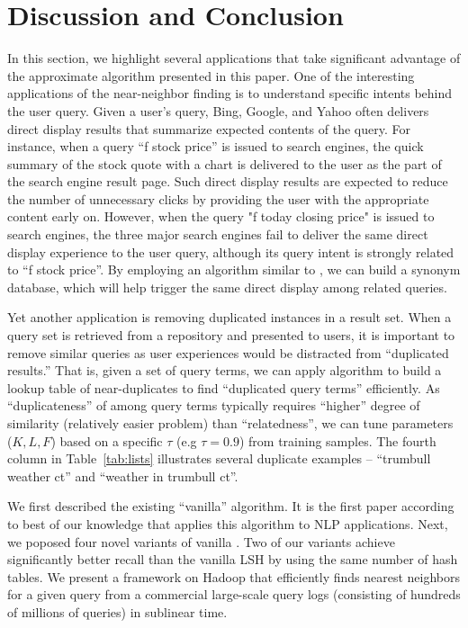 \section{Discussion and Conclusion}
\label{sec:discuss}
In this section, we highlight several applications that take significant advantage of the approximate \dflipb algorithm presented in this paper.
One of the interesting applications of the near-neighbor finding is to understand specific intents behind the user query. 
Given a user's query, Bing, Google, and Yahoo often delivers direct display results that summarize expected contents of the query. 
For instance, when a query ``f stock price'' is issued  to search engines, the quick summary of the stock quote with a chart is delivered 
to the user as the part of the search engine result page. 
Such direct display results are expected to reduce the number of unnecessary clicks by providing the user with the appropriate content early on. 
However, when the query "f today closing price" is issued to search engines, the three major search engines 
fail to deliver the same direct display experience to the user query, although its query intent is strongly related to ``f stock price''. 
By employing an algorithm similar to \dflipb, we can build a synonym database, 
which will help trigger the same direct display among related queries.

Yet another application is removing duplicated instances in a result set. 
When a query set is retrieved from a repository and presented to users, it is important to remove similar queries as user experiences 
would be distracted from ``duplicated results.'' 
That is, given a set of query terms, we can apply  \dflipb algorithm to build a lookup table of near-duplicates 
to find ``duplicated query terms'' efficiently. As ``duplicateness'' of among query terms typically requires ``higher'' degree of similarity (relatively easier problem) than ``relatedness'', we can tune parameters ($K, L, F$) based on a specific $\tau$ (e.g $\tau=0.9$) from training samples.  The fourth column in Table~\ref{tab:lists} illustrates several duplicate examples -- ``trumbull weather ct'' and ``weather in trumbull ct''.

We first described the existing ``vanilla'' \lsh algorithm. It is the first paper according to 
best of our knowledge that applies this algorithm to NLP applications. 
Next, we poposed four novel variants of vanilla \lsh. Two of our variants achieve 
significantly better recall than the vanilla LSH by using the same number of hash tables. 
We present a framework on Hadoop that efficiently finds nearest neighbors for a given query from a commercial large-scale query logs (consisting of hundreds of millions of queries) in sublinear time.
